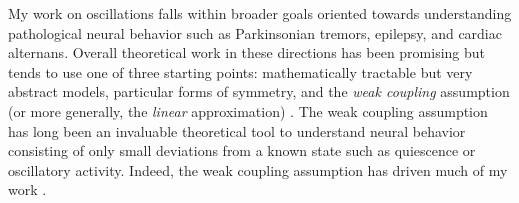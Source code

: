 \documentclass[a4paper,11pt]{article}
\begin{document}
	
	
	My work on oscillations falls within broader goals oriented towards understanding pathological neural behavior such as Parkinsonian tremors, epilepsy, and cardiac alternans. Overall theoretical work in these directions has been promising but tends to use one of three starting points: mathematically tractable but very abstract models, particular forms of symmetry, and the \textit{weak coupling} assumption (or more generally, the \textit{linear} approximation) \cite{ermentrout2002modeling}. The weak coupling assumption has long been an invaluable theoretical tool to understand neural behavior consisting of only small deviations from a known state such as quiescence or oscillatory activity. Indeed, the weak coupling assumption has driven much of my work \cite{park2016weakly,park2018multiple,park2018scalar}. 
	
\end{document}
